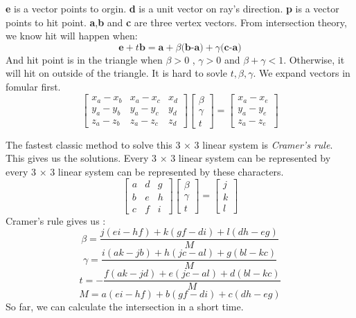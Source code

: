 \documentclass[10pt,conference,compsoc]{IEEEtran}
\begin{document}
	\textbf{e} is a vector points to orgin. \textbf{d} is a unit vector on ray's direction. \textbf{p} is a vector points to hit point. \textbf{a},\textbf{b} and \textbf{c} are three vertex vectors.  From intersection theory, we know hit will happen when:
	$$\textbf{e} + t\textbf{b}  = \textbf{a} + \beta\textbf{(b-a)} + \gamma\textbf{(c-a)}$$
	And hit point is in the triangle when $\beta > 0$ , $\gamma > 0$ and $\beta + \gamma < 1$. Otherwise, it will hit on outside of the triangle. It is hard to sovle $t,\beta,\gamma$. We expand vectors in fomular first.
	\begin{equation}       %
	\left[                %
	\begin{array}{ccc}   %
	x_a - x_b & x_a - x_c & x_d \\
	y_a - y_b & y_a - y_c & y_d \\
	z_a - z_b & z_a -z_c & z_d
	\end{array}
	\right]                 %
	\left[                %
	\begin{array}{c}   %
	\beta\\
	\gamma\\
	t
	\end{array}
	\right]  
	=
	\left[            %
	\begin{array}{c}   %
	x_a - x_e\\
	y_a - y_e\\
	z_a - z_e
	\end{array}
	\right] 
	\end{equation}

	The fastest classic method to solve this 3 × 3 linear system is \textit{Cramer’s rule}. This gives us the solutions. Every 3 × 3 linear system can be represented by every 3 × 3 linear system can be represented by these characters.
	\begin{equation}       %
	\left[                %
	\begin{array}{ccc}   %
	a & d & g \\
	b & e & h \\
	c & f & i
	\end{array}
	\right]                 %
	\left[                %
	\begin{array}{c}   %
	\beta\\
	\gamma\\
	t
	\end{array}
	\right]  
	=
	\left[            %
	\begin{array}{c}   %
	j\\
	k\\
	l
	\end{array}
	\right] 
	\end{equation}
	Cramer’s rule gives us :
	$$\beta = \frac{j(ei-hf)+k(gf-di)+l(dh-eg)}{M}$$
	$$\gamma = \frac{i(ak-jb) + h(jc-al) + g(bl-kc)}{M}$$
	$$t = - \frac{f(ak-jd) + e(jc-al) + d(bl - kc)}{M}$$
	$$M = a(ei-hf) + b(gf - di) + c(dh - eg)$$
	So far, we can calculate the intersection in a short time.
\end{document}
